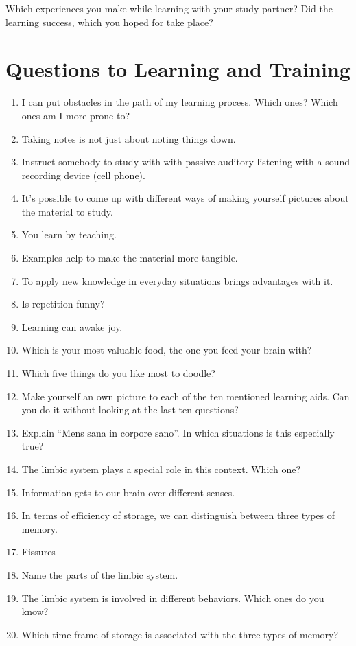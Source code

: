 \documentclass[../main.tex]{subfiles}
\begin{document}
Which experiences you make while learning with your study partner?
Did the learning success, which you hoped for take place?

\section{Questions to Learning and Training}
\begin{enumerate}
\item I can put obstacles in the path of my learning process. Which ones? Which ones am I more prone to?
\item Taking notes is not just about noting things down.
\item Instruct somebody to study with with passive auditory listening with a sound recording device (cell phone).
\item It's possible to come up with different ways of making yourself pictures about the material to study.
\item You learn by teaching.
\item Examples help to make the material more tangible.
\item To apply new knowledge in everyday situations brings advantages with it.
\item Is repetition funny?
\item Learning can awake joy.
\item Which is your most valuable food, the one you feed your brain with?
\item Which five things do you like most to doodle?
\item Make yourself an own picture to each of the ten mentioned learning aids.
  Can you do it without looking at the last ten questions?
\item Explain ``Mens sana in corpore sano''. In which situations is this especially true?
\item The limbic system plays a special role in this context. Which one?
\item Information gets to our brain over different senses.
\item In terms of efficiency of storage, we can distinguish between three types of memory.
\item Fissures
\item Name the parts of the limbic system.
\item The limbic system is involved in different behaviors. Which ones do you know?
\item Which time frame of storage is associated with the three types of memory?

\end{enumerate}
\end{document}
